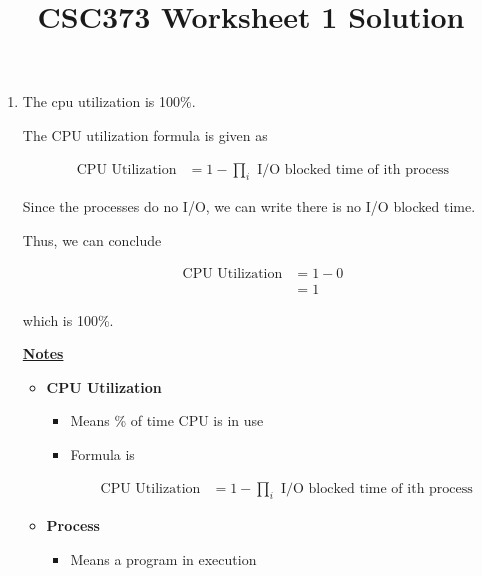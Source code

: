 \documentclass[12pt]{article}
\begin{document}
\title{CSC373 Worksheet 1 Solution}

\maketitle

\bigskip

\begin{enumerate}[1.]
    \item

    \bigskip

    The cpu utilization is 100\%.

    \bigskip

    The CPU utilization formula is given as

    \begin{align}
        \text{CPU Utilization} &= 1 - \prod\limits_{i} \text{ I/O blocked time of ith process}
    \end{align}

    \bigskip

    Since the processes do no I/O, we can write there is no I/O blocked time.

    \bigskip

    Thus, we can conclude


    \begin{align}
        \text{CPU Utilization} &= 1 - 0\\
        &= 1
    \end{align}

    which is 100\%.

    \bigskip

    \underline{\textbf{Notes}}

    \begin{itemize}
        \item \textbf{CPU Utilization}

        \begin{itemize}
            \item Means \% of time CPU is in use
            \item Formula is

            \begin{align}
                \text{CPU Utilization} &= 1 - \prod\limits_{i} \text{ I/O blocked time of ith process}
            \end{align}
        \end{itemize}
        \item \textbf{Process}

        \begin{itemize}
            \item Means a program in execution
        \end{itemize}


\end{itemize}
\end{enumerate}
\end{document}
